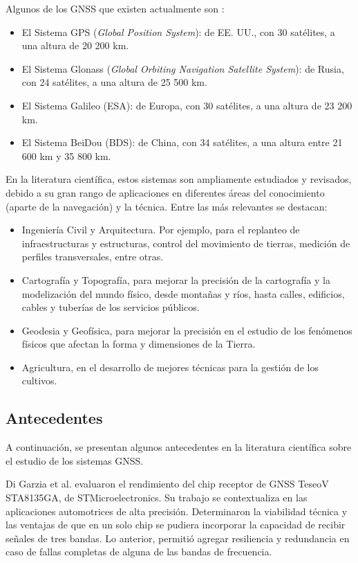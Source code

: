 Algunos de los GNSS que existen actualmente son \citep{GNSS-Junta-Adalucia}:

\begin{itemize}
    \item El Sistema GPS (\textit{Global Position System}): de EE. UU., con 30 satélites, a una altura de 20 200 km.
    \item El Sistema Glonass (\textit{Global Orbiting Navigation Satellite System}): de Rusia, con 24 satélites, a una altura de 25 500 km.
    \item El Sistema Galileo (ESA): de Europa, con 30 satélites, a una altura de 23 200 km.
    \item El Sistema BeiDou (BDS): de China, con 34 satélites, a una altura entre 21 600 km y 35 800  km.
\end{itemize}

En la literatura científica, estos sistemas son ampliamente estudiados y revisados, debido a su gran rango de aplicaciones en diferentes áreas del conocimiento (aparte de la navegación) y la técnica. Entre las más relevantes se destacan:

\begin{itemize}
    \item Ingeniería Civil y Arquitectura. Por ejemplo, para el replanteo de infraestructuras y estructuras, control del movimiento de tierras, medición de perfiles transversales, entre otras.
    \item Cartografía y Topografía, para mejorar la precisión de la cartografía y la modelización del mundo físico, desde montañas y ríos, hasta calles, edificios, cables y tuberías de los servicios públicos.
    \item Geodesia y Geofísica, para mejorar la precisión en el estudio de los fenómenos físicos que afectan la forma y dimensiones de la Tierra.
    \item Agricultura, en el desarrollo de mejores técnicas para la gestión de los cultivos. 
\end{itemize}

\subsection{Antecedentes}

A continuación, se presentan algunos antecedentes en la literatura científica sobre el estudio de los sistemas GNSS. 

Di Garzia et al. \citep{DiGrazia} evaluaron el rendimiento del chip receptor de GNSS TeseoV STA8135GA, de STMicroelectronics. Su trabajo se contextualiza en las aplicaciones automotrices de alta precisión. Determinaron la viabilidad técnica y las ventajas de que en un solo chip se pudiera incorporar la capacidad de recibir señales de tres bandas. Lo anterior, permitió agregar resiliencia y redundancia en caso de fallas completas de alguna de las bandas de frecuencia. 

